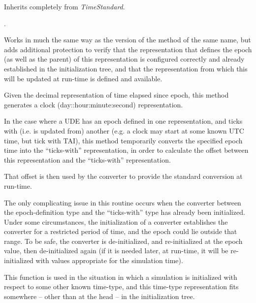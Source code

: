 {\begin{enumerate}
Inherits completely from \textit{TimeStandard}.

\label{ref:TimeUDE}
 .


{\begin{enumerate}
Works in much the same way as the 
version of the
method of the same name, but adds additional protection to verify that
the representation that defines the epoch (as well as the parent) of
this representation is configured correctly and already established in
the initialization tree, and that the representation from which this
will be updated at run-time is defined and available.

Given the decimal representation of time elapsed since epoch, this
method generates a clock (day::hour:minute:second) representation. 




\label{ref:convertepochtoupdate}In the case where a UDE has an epoch
defined in one representation, and ticks with (i.e. is updated from)
another (e.g. a clock may start at some known UTC time, but tick with
TAI), this method temporarily converts the specified epoch time into
the {\textquotedblleft}ticks-with{\textquotedblright} representation,
in order to calculate the offset between this representation and the
{\textquotedblleft}ticks-with{\textquotedblright} representation.




That offset is then used by the converter to provide the standard
conversion at run-time.




The only complicating issue in this routine occurs when the converter
between the epoch-definition type and the
{\textquotedblleft}ticks-with{\textquotedblright} type has already been
initialized.  Under some circumstances, the initialization of a
converter establishes the converter for a restricted period of time,
and the epoch could lie outside that range.  To be safe, the converter
is de-initialized, and re-initialized at the epoch value, then
de-initialized again (if it is needed later, at run-time, it will be
re-initialized with values appropriate for the simulation time).




This function is used in the situation in which a simulation is
initialized with respect to some other known time-type, and this time-type
representation fits somewhere -- other than at the head -- in the
initialization tree.





\end{enumerate}}
\end{enumerate}}
